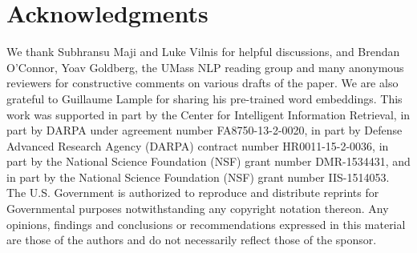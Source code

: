 \documentclass[11pt,letterpaper]{article}
\begin{document}
\section*{Acknowledgments}
We thank Subhransu Maji and Luke Vilnis for helpful discussions, and Brendan O'Connor, Yoav Goldberg, the UMass NLP reading group and many anonymous reviewers for constructive comments on various drafts of the paper. We are also grateful to Guillaume Lample for sharing his pre-trained word embeddings. This work was supported in part by the Center for Intelligent Information Retrieval, in part by DARPA under agreement number FA8750-13-2-0020, in part by Defense Advanced Research Agency (DARPA) contract number HR0011-15-2-0036, in part by the National Science Foundation (NSF) grant number DMR-1534431, and in part by the National Science Foundation (NSF) grant number IIS-1514053. The U.S. Government is authorized to reproduce and distribute reprints for Governmental purposes notwithstanding any copyright notation thereon. Any opinions, findings and conclusions or recommendations expressed in this material are those of the authors and do not necessarily reflect those of the sponsor.





\end{document}
